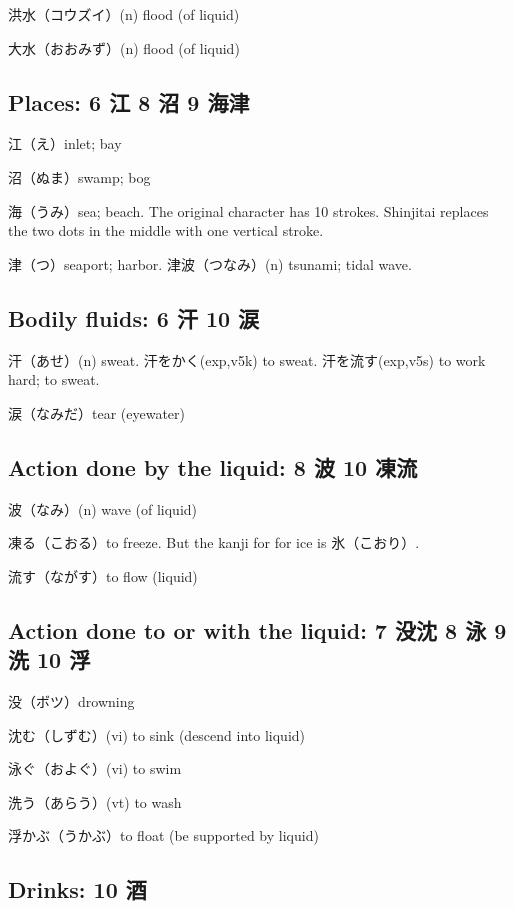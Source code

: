 洪水（コウズイ）(n) flood (of liquid)

大水（おおみず）(n) flood (of liquid)

\subsection{Places: 6 江 8 沼 9 海津}

江（え）inlet; bay

沼（ぬま）swamp; bog

海（うみ）sea; beach.
The original character has 10 strokes.
Shinjitai replaces the two dots in the middle
with one vertical stroke.

津（つ）seaport; harbor.
津波（つなみ）(n) tsunami; tidal wave.

\subsection{Bodily fluids: 6 汗 10 涙}

汗（あせ）(n) sweat.
汗をかく(exp,v5k) to sweat.
汗を流す(exp,v5s) to work hard; to sweat.

涙（なみだ）tear (eyewater)

\subsection{Action done by the liquid: 8 波 10 凍流}

波（なみ）(n) wave (of liquid)

凍る（こおる）to freeze.
But the kanji for for ice is 氷（こおり）.

流す（ながす）to flow (liquid)

\subsection{Action done to or with the liquid: 7 没沈 8 泳 9 洗 10 浮}

没（ボツ）drowning

沈む（しずむ）(vi) to sink (descend into liquid)

泳ぐ（およぐ）(vi) to swim

洗う（あらう）(vt) to wash

浮かぶ（うかぶ）to float (be supported by liquid)

\subsection{Drinks: 10 酒}

